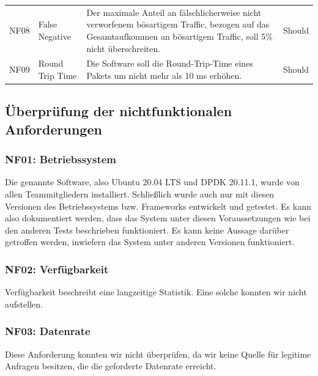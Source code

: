 \documentclass[../review_3.tex]{subfiles}
\begin{document}
\begin{longtable}[ht] { p{1cm} p{4cm} p{7cm} l }
    NF08        & False Negative       & Der maximale Anteil an fälschlicherweise nicht verworfenem bösartigem Traffic, bezogen auf das Gesamtaufkommen an bösartigem Traffic, soll 5\% nicht überschreiten.                                                                      & Should          \\
    NF09        & Round Trip Time      & Die Software soll die Round-Trip-Time eines Pakets um nicht mehr als 10 ms erhöhen. & Should                                                                                                                                                                       \\ \bottomrule
\end{longtable}

\subsection{Überprüfung der nichtfunktionalen Anforderungen}

\subsubsection{NF01: Betriebssystem}
Die genannte Software, also Ubuntu 20.04 LTS und DPDK 20.11.1, wurde von allen Teammitgliedern installiert. Schließlich wurde auch nur mit diesen Versionen des Betriebssystems bzw. Frameworks entwickelt und getestet. Es kann also dokumentiert werden, dass das System unter diesen Voraussetzungen wie bei den anderen Tests beschrieben funktioniert. Es kann keine Aussage darüber getroffen werden, inwiefern das System unter anderen Versionen funktioniert.

\subsubsection{NF02: Verfügbarkeit}
Verfügbarkeit beschreibt eine langzeitige Statistik. Eine solche konnten wir nicht aufstellen.

\subsubsection{NF03: Datenrate}
Diese Anforderung konnten wir nicht überprüfen, da wir keine Quelle für legitime Anfragen besitzen, die die geforderte Datenrate erreicht.
\end{document}
